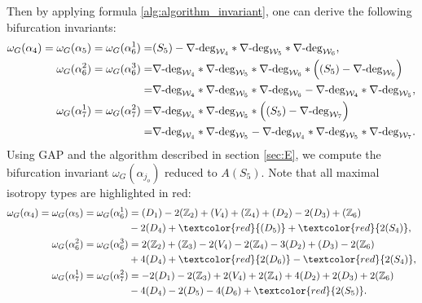 \documentclass{amsart}%
\begin{document}
Then by applying formula \eqref{alg:algorithm_invariant}, one can derive the following bifurcation invariants:
\begin{align}\label{eq:invariant}
\omega_{G}(\alpha_{4}) =\omega_{G}(\alpha_{5})=\omega_{G}(\alpha_{6}^1)  =&(S_5)-\nabla\text{\textrm{-deg}}_{\mathcal{W}_{4}%
}*\nabla\text{\textrm{-deg}}_{\mathcal{W}_{5}%
}*\nabla\text{\textrm{-deg}}_{\mathcal{W}_{6}%
},\\
\omega_{G}(\alpha_{6}^{2})=\omega_{G}(\alpha_{6}^{3}) =&\nabla\text{\textrm{-deg}}_{\mathcal{W}_{4}%
}*\nabla\text{\textrm{-deg}}_{\mathcal{W}_{5}%
}*\nabla\text{\textrm{-deg}}_{\mathcal{W}_{6}%
}\ast\Big((S_{5})-\nabla\text{\textrm{-deg}}_{\mathcal{W}_{6}}\Big)\nonumber\\=&\nabla\text{\textrm{-deg}}_{\mathcal{W}_{4}%
}*\nabla\text{\textrm{-deg}}_{\mathcal{W}_{5}%
}*\nabla\text{\textrm{-deg}}_{\mathcal{W}_{6}%
}-\nabla\text{\textrm{-deg}}_{\mathcal{W}_{4}%
}\ast\nabla\text{\textrm{-deg}}_{\mathcal{W}_{5}},\nonumber\\
\omega_{G}(\alpha_{7}^{1})=\omega_{G}(\alpha_{7}^{2}) =&\nabla\text{\textrm{-deg}}_{\mathcal{W}_{4}%
}\ast\nabla\text{\textrm{-deg}}_{\mathcal{W}_{5}}\ast\Big((S_5)-\nabla
\text{\textrm{-deg}}_{\mathcal{W}_{7}}\Big)\nonumber\\
=&\nabla\text{\textrm{-deg}}_{\mathcal{W}_{4}%
}\ast\nabla\text{\textrm{-deg}}_{\mathcal{W}_{5}}-\nabla\text{\textrm{-deg}}_{\mathcal{W}_{4}%
}\ast\nabla\text{\textrm{-deg}}_{\mathcal{W}_{5}}\ast\nabla
\text{\textrm{-deg}}_{\mathcal{W}_{7}}.\nonumber
\end{align}
Using GAP and the algorithm described in section \ref{sec:E}, we compute the bifurcation invariant $\omega_{G}(\alpha_{j_o})$ reduced to $A(S_5).$ Note that all maximal isotropy types are highlighted in red:%
\begin{align}
\omega_{G}(\alpha_{4})=\omega_{G}(\alpha_{5})=\omega_{G}(\alpha_{6}^1)&=(D_1)-2(\mathbb Z_2)+(V_4)+(\mathbb Z_4)+(D_2)-2(D_3)+(\mathbb Z_6)\label{bifurcaitoninvariant}\\
&-2(D_4)+\textcolor{red}{(D_5)}+\textcolor{red}{2(S_4)},\notag\\
\omega_{G}(\alpha_{6}^{2})=\omega_{G}(\alpha_{6}^{3})&= 2(\mathbb Z_2)+(\mathbb Z_3)-2(V_4)-2(\mathbb Z_4)-3(D_2)+(D_3)-2(\mathbb Z_6)\\
&+4(D_4)+\textcolor{red}{2(D_6)}
-\textcolor{red}{2(S_4)},\notag\\
\omega_{G}(\alpha_{7}^{1})=\omega_{G}(\alpha_{7}^{2})&=-2(D_1)-2(\mathbb Z_3)+2(V_4)+2(\mathbb Z_4)+4(D_2)+2(D_3)+2(\mathbb Z_6)\\
&-4(D_4)-2(D_5)-4(D_6)+\textcolor{red}{2(S_5)}.\notag
\end{align}
\end{document}
